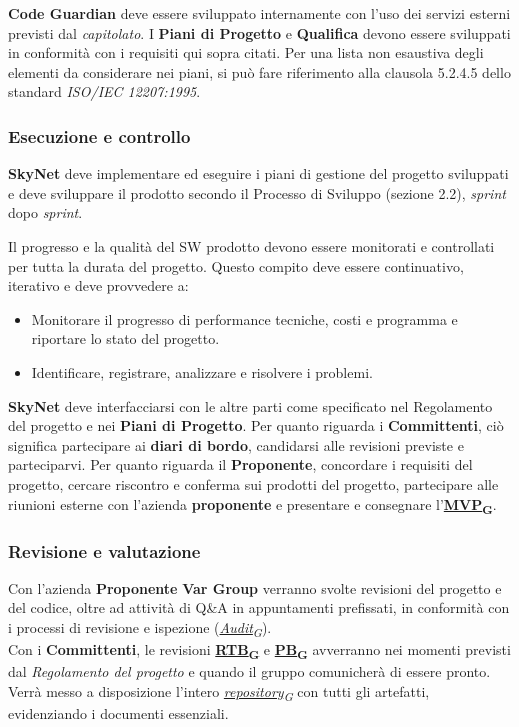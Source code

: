 \documentclass[12pt, a4paper]{article}
\newcommand{\urlglossario}{https://skynetunigroup.github.io/Code_Guardian/Documentazione/PB/glossario_v2.0.0.pdf} %
\newcommand{\glo}[2]{\href{\urlglossario\#nameddest=#2}{#1\textsubscript{G}}}
\begin{document}
\textbf{Code Guardian} deve essere sviluppato internamente con l'uso dei servizi esterni previsti dal \textit{capitolato}. I \textbf{Piani di Progetto} e \textbf{Qualifica} devono essere sviluppati in conformità con i requisiti qui sopra citati. Per una lista non esaustiva degli elementi da considerare nei piani, si può fare riferimento alla clausola 5.2.4.5 dello standard \textit{ISO/IEC 12207:1995}.

\subsubsection{Esecuzione e controllo}
\textbf{SkyNet} deve implementare ed eseguire i piani di gestione del progetto sviluppati e deve sviluppare il prodotto secondo il Processo di Sviluppo (sezione 2.2), \textit{sprint} dopo \textit{sprint}. 

Il progresso e la qualità del SW prodotto devono essere monitorati e controllati per tutta la durata del progetto. Questo compito deve essere continuativo, iterativo e deve provvedere a:
\begin{itemize}
    \item Monitorare il progresso di performance tecniche, costi e programma e riportare lo stato del progetto.
    \item Identificare, registrare, analizzare e risolvere i problemi.
\end{itemize}

\textbf{SkyNet} deve interfacciarsi con le altre parti come specificato nel Regolamento del progetto e nei \textbf{Piani di Progetto}. Per quanto riguarda i \textbf{Committenti}, ciò significa partecipare ai \textbf{diari di bordo}, candidarsi alle revisioni previste e parteciparvi. Per quanto riguarda il \textbf{Proponente}, concordare i requisiti del progetto, cercare riscontro e conferma sui prodotti del progetto, partecipare alle riunioni esterne con l'azienda \textbf{proponente} e presentare e consegnare l'\textbf{\glo{MVP}{mvp}}.

\subsubsection{Revisione e valutazione}
Con l'azienda \textbf{Proponente} \textbf{Var Group} verranno svolte revisioni del progetto e del codice, oltre ad attività di Q\&A in appuntamenti prefissati, in conformità con i processi di revisione e ispezione (\textit{\glo{Audit}{audit}}).\\
Con i \textbf{Committenti}, le revisioni \textbf{\glo{RTB}{rtb}} e \textbf{\glo{PB}{pb}} avverranno nei momenti previsti dal \textit{Regolamento del progetto} e quando il gruppo comunicherà di essere pronto. Verrà messo a disposizione l'intero \textit{\glo{repository}{repository}} con tutti gli artefatti, evidenziando i documenti essenziali.
\end{document}
